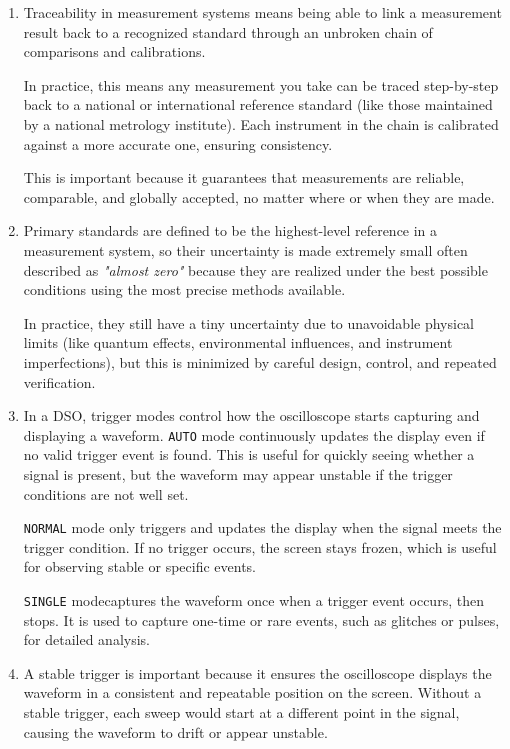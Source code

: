 \documentclass[../main.tex]{subfiles}
\begin{document}
\begin{enumerate}[label=\textbf{\arabic*.}]
	So, measurement is essentially a structured comparison that turns a physical quantity into a meaningful number by referencing a standard.

	
	\item Traceability in measurement systems means being able to link a measurement result back to a recognized standard through an unbroken chain of comparisons and calibrations.

	In practice, this means any measurement you take can be traced step-by-step back to a national or international reference standard (like those maintained by a national metrology institute). Each instrument in the chain is calibrated against a more accurate one, ensuring consistency.

	This is important because it guarantees that measurements are reliable, comparable, and globally accepted, no matter where or when they are made.

	
	\item Primary standards are defined to be the highest-level reference in a measurement system, so their uncertainty is made extremely small often described as \textit{"almost zero"} because they are realized under the best possible conditions using the most precise methods available.
 
 	In practice, they still have a tiny uncertainty due to unavoidable physical limits (like quantum effects, environmental influences, and instrument imperfections), but this is minimized by careful design, control, and repeated verification.	
	
	\item In a DSO, trigger modes control how the oscilloscope starts capturing and displaying a waveform.
	\texttt{AUTO} mode continuously updates the display even if no valid trigger event is found. This is useful for quickly seeing whether a signal is present, but the waveform may appear unstable if the trigger conditions are not well set.

	\texttt{NORMAL} mode only triggers and updates the display when the signal meets the trigger condition. If no trigger occurs, the screen stays frozen, which is useful for observing stable or specific events.

	\texttt{SINGLE} modecaptures the waveform once when a trigger event occurs, then stops. It is used to capture one-time or rare events, such as glitches or pulses, for detailed analysis.

	\item A stable trigger is important because it ensures the oscilloscope displays the waveform in a consistent and repeatable position on the screen. Without a stable trigger, each sweep would start at a different point in the signal, causing the waveform to drift or appear unstable.


\end{enumerate}
\end{document}

